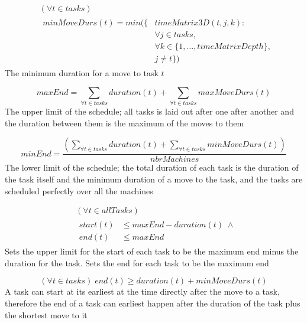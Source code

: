 \documentclass[10pt,a4paper]{report}
\begin{document}
\begin{equation}
\begin{aligned}\label{eq:58}
&(\forall t \in tasks)\\
&\begin{aligned}
minMoveDurs(t) = min(\{&timeMatrix3D(t,j,k) :\\
&\forall j \in tasks, \\
&\forall k \in \{1 , \ldots , timeMatrixDepth\},\\
&j \neq t\})
\end{aligned}
\end{aligned}
\end{equation}
The minimum duration for a move to task $t$

\begin{equation}\label{eq:59}
maxEnd = \sum_{\forall t \in tasks} duration(t) + \sum_{\forall t \in tasks} maxMoveDurs(t)
\end{equation}
The upper limit of the schedule; all tasks is laid out after one after another and the duration between them is the maximum of the moves to them

\begin{equation}\label{eq:60}
minEnd = \frac{\left(\sum_{\forall t \in tasks} duration(t) + \sum_{\forall t \in tasks} minMoveDurs(t)\right)}{nbrMachines}
\end{equation}
The lower limit of the schedule; the total duration of each task is the duration of the task itself and the minimum duration of a move to the task, and the tasks are scheduled perfectly over all the machines

\begin{equation}\label{eq:61}
\begin{aligned}
&(\forall t \in allTasks)\\
&\begin{aligned}
start(t) &\le maxEnd-duration(t) \; \land\\
end(t) &\le maxEnd
\end{aligned}
\end{aligned}
\end{equation}
Sets the upper limit for the start of each task to be the maximum end minus the duration for the task. Sets the end for each task to be the maximum end

\begin{equation}\label{eq:62}
(\forall t \in tasks) \; end(t) \ge duration(t) + minMoveDurs(t)\end{equation}
A task can start at its earliest at the time directly after the move to a task, therefore the end of a task can earliest happen after the duration of the task plus the shortest move to it
\end{document}
